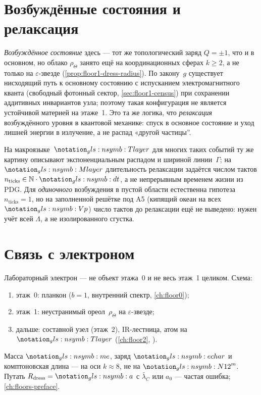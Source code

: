 \section{Возбуждённые состояния и релаксация}
\label{sec:floor1-excited-states}

\emph{Возбуждённое состояние} здесь --- тот же топологический заряд $Q=\pm1$, что и в основном,
но облако $\rho_\Theta$ занято ещё на координационных сферах $k\ge 2$, а не только на $\varepsilon$-звезде
(\cref{prop:floor1-dress-radius}).
По закону~$g$ существует нисходящий путь к основному состоянию с испусканием
электромагнитного кванта (свободный фотонный сектор, \cref{sec:floor1-census})
при сохранении аддитивных инвариантов узла;
поэтому такая конфигурация не является устойчивой материей на этаже~1.
Это та же логика, что \emph{релаксация} возбуждённого уровня в квантовой механике:
спуск в основное состояние и уход лишней энергии в излучение, а не распад «другой частицы''.

На макроязыке~$\layerMacro$ для многих таких событий ту же картину описывают
экспоненциальным распадом и шириной линии~$\Gamma$;
на~$\layerMicro$ длительность релаксации задаётся числом тактов
$n_{\mathrm{ticks}}\in\mathbb{N}\cdot\htick$, а не непрерывным временем жизни из PDG.
Для \emph{одиночного} возбуждения в пустой области естественна гипотеза $n_{\mathrm{ticks}}=1$,
но на заполненной решётке под A5 (кипящий океан на всех $\hv$) число тактов до релаксации
ещё не выведено: нужен учёт всей $\Lambda$, а не изолированного сгустка.

\section{Связь с электроном}
\label{sec:floor1-electron-bridge}

Лабораторный электрон --- не объект этажа~0 и не весь этаж~1 целиком.
Схема:
\begin{enumerate}[noitemsep]
\item этаж~0: планкон ($b=1$, внутренний спектр, \cref{ch:floor0});
\item этаж~1: неустранимый ореол~$\rho_\Theta$ на $\varepsilon$-звезде;
\item дальше: составной узел (этаж~2), IR-лестница, атом на~$\layerMacro$
  (\cref{ch:floor2}, ).
\end{enumerate}

Масса $\massElectron$, заряд $\chargeE$ и комптоновская длина --- на оси $k\approx 8$,
не на $\geomNeighborTwelve^{m}$.
Путать $R_{\mathrm{dress}}=\caStepSpace$ с $\bar\lambda_C$ или $a_0$ --- частая ошибка;
\cref{ch:floors-preface}.

